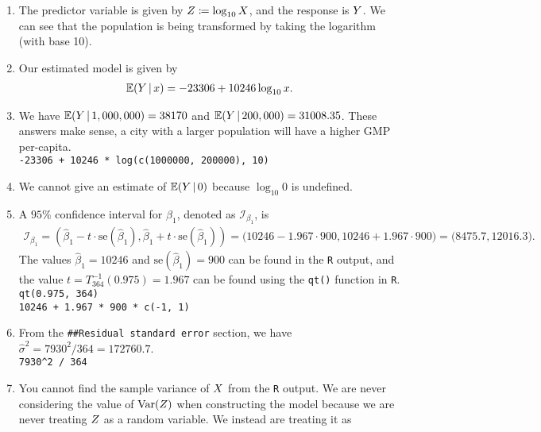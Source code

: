 \documentclass[10pt]{article}
\begin{document}
\begin{enumerate}
    \item The predictor variable is given by \(Z \coloneqq \log_{10}X\), and the response is \(Y\). We can see that the population is being transformed 
    by taking the logarithm (with base 10). 
    \item Our estimated model is given by 
    \begin{align}
        \mathbb{E}(Y \,|\, x)
        = -23306 + 10246 \log_{10} x.
    \end{align}
    \item We have \(\mathbb{E}(Y \,|\, 1,000,000) = 38170\) and \(\mathbb{E}(Y \,|\, 200,000) = 31008.35\).
    These answers make sense, a city with a larger population will have a higher GMP per-capita. \\[0.5em]
    \texttt{-23306 + 10246 * log(c(1000000, 200000), 10)}
    \item We cannot give an estimate of \(\mathbb{E}(Y \,|\, 0)\) because \(\log_{10} 0\) is undefined.
    \item A \(95\%\) confidence interval for \(\beta_1\), denoted as \(\mathcal{I}_{\beta_1}\), is
    \begin{align}
        \mathcal{I}_{\beta_1}
        = \left( \hat{\beta}_1 - t \cdot \mathrm{se}(\hat{\beta}_1), \hat{\beta}_1 + t \cdot \mathrm{se}(\hat{\beta}_1) \right)
        = \big( 10246 - 1.967 \cdot 900, 10246 + 1.967 \cdot 900 \big)
        = \big( 8475.7, 12016.3 \big).
    \end{align}
    The values \(\hat{\beta}_1 = 10246\) and \(\mathrm{se}(\hat{\beta}_1) = 900\) can be found in the \texttt{R} output, and the value 
    \(t = T_{364}^{-1}(0.975) = 1.967\) can be found using the \texttt{qt()} function in \texttt{R}. \\[0.5em]
    \texttt{qt(0.975, 364)}\\[0.5em]
    \texttt{10246 + 1.967 * 900 * c(-1, 1)}
    \item From the \texttt{\#{}\#{}Residual standard error} section, we have \(\hat{\sigma}^2 = 7930^2/364 = 172760.7\). \\[0.5em]
    \texttt{7930\textasciicircum{}2 / 364}
    \item You cannot find the sample variance of \(X\) from the \texttt{R} output. We are never considering the value of 
    \(\mathrm{Var}(Z)\) when constructing the model because we are never treating \(Z\) as a random variable. We instead are treating it as 

\end{enumerate}
\end{document}
